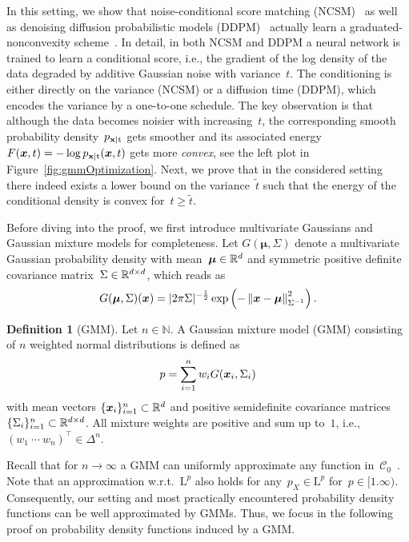 \documentclass[nohyperref]{article}
\newcommand{\N}{\mathbb{N}}
\newcommand{\C}{\mathcal{C}}
\renewcommand{\L}{\mathrm{L}}
\newcommand{\norm}[1]{\left\Vert#1\right\Vert}
\newcommand{\pdf}[1]{p_{#1}}
\theoremstyle{plain}
\theoremstyle{definition}
\newtheorem{definition}[theorem]{Definition}
\theoremstyle{remark}
\begin{document}
In this setting, we show that noise-conditional score matching (NCSM)~\citep{SoEr19} as well as denoising diffusion probabilistic models (DDPM)~\citep{HoJa20} actually learn a graduated-nonconvexity scheme~\citep{BlZi87}.
In detail, in both NCSM and DDPM a neural network is trained to learn a conditional score, i.e., the gradient of the log density of the data degraded by additive Gaussian noise with variance~$t$.
The conditioning is either directly on the variance (NCSM) or a diffusion time (DDPM), which encodes the variance by a one-to-one schedule.
The key observation is that although the data becomes noisier with increasing~$t$, the corresponding smooth probability density~$\pdf{\rvx\vert\rt}$ gets smoother and its associated energy~$F(\vx,t)=-\log\pdf{\rvx\vert\rt}(\vx,t)$ gets more \emph{convex}, see the left plot in Figure~\ref{fig:gmmOptimization}.
Next, we prove that in the considered setting there indeed exists a lower bound on the variance~$\widetilde{t}$ such that the energy of the conditional density is convex for~$t\geq\widetilde{t}$.

Before diving into the proof, we first introduce multivariate Gaussians and Gaussian mixture models for completeness.
Let $G(\bm{\mu},\Sigma)$ denote a multivariate Gaussian probability density with mean~$\bm{\mu}\in\mathbb{R}^d$ and symmetric positive definite covariance matrix~$\Sigma\in\mathbb{R}^{d\times d}$, which reads as
\[
G(\bm{\mu},\Sigma)(\vx)=\vert 2\pi\Sigma\vert^{-\frac{1}{2}}\exp\left(-\norm{\vx-\bm{\mu}}_{\Sigma^{-1}}^2\right).
\]
\begin{definition}[GMM]
Let $n\in\N$.
A Gaussian mixture model (GMM) consisting of $n$ weighted normal distributions is defined as
\[
p = \sum_{i=1}^n w_i G({\bm{x}}_i,\Sigma_i)
\]
with mean vectors $\{{\bm{x}}_i\}_{i=1}^n\subset\mathbb{R}^d$ and positive semidefinite covariance matrices~$\{\Sigma_i\}_{i=1}^n\subset\mathbb{R}^{d\times d}$.
All mixture weights are positive and sum up to~$1$, i.e., $(w_1\ \cdots\ w_n)^\top\in\Delta^n$.
\end{definition}
Recall that for $n\to\infty$ a GMM can uniformly approximate any function in~$\C_0$~\citep{NgNg20}.
Note that an approximation w.r.t.~$\L^p$ also holds for any~$p_X\in\L^p$ for~$p\in[1.\infty)$.
Consequently, our setting and most practically encountered probability density functions can be well approximated by GMMs.
Thus, we focus in the following proof on probability density functions induced by a GMM.
\end{document}
